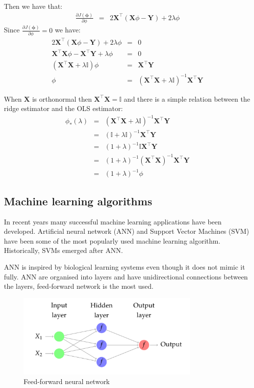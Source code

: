 Then we have that:
\begin{eqnarray*}
\frac{\partial J(\mathbf{\phi})}{\partial \phi}&=& 
 2\mathbf{X}^\top(\mathbf{X}\phi-\mathbf{Y}) + 2\lambda\phi
\end{eqnarray*}
Since $\frac{\partial J(\mathbf{\phi})}{\partial \phi}=0$ we have:
\begin{eqnarray*}
2\mathbf{X}^\top(\mathbf{X}\phi-\mathbf{Y}) + 2\lambda\phi&=&0 \\
\mathbf{X}^\top\mathbf{X}\phi - \mathbf{X}^\top\mathbf{Y} + \lambda\phi &=& 0\\
(\mathbf{X}^\top\mathbf{X}+\lambda\mathbb{I})\phi &=&  \mathbf{X}^\top\mathbf{Y} \\
\phi &=& (\mathbf{X}^\top\mathbf{X}+\lambda\mathbb{I})^{-1}  \mathbf{X}^\top\mathbf{Y}
\end{eqnarray*}


When $\mathbf{X}$ is orthonormal then $\mathbf{X}^\top \mathbf{X} =\mathbb{I}$ and there is a simple relation between the ridge estimator and the OLS estimator:
\begin{eqnarray*}
\phi_* (\lambda) &=& (\mathbf{X}^\top \mathbf{X}+\lambda \mathbb{I})^{-1}\mathbf{X}^\top \mathbf{Y} \\
 &=& (\mathbb{I} + \lambda \mathbb{I})^{-1} \mathbf{X}^\top \mathbf{Y} \\
 &=&(1+\lambda)^{-1} \mathbb{I} \mathbf{X}^\top \mathbf{Y} \\
 &=&(1+\lambda)^{-1} (\mathbf{X}^\top \mathbf{X})^{-1}\mathbf{X}^\top \mathbf{Y} \\
 &=&(1+\lambda)^{-1} \phi
\end{eqnarray*}

\subsection{Machine learning algorithms}
In recent years many successful machine learning applications have been developed. Artificial neural network (ANN) and Support Vector Machines (SVM) have been some of the most popularly used machine learning algorithm. Historically, SVMs emerged after ANN.

ANN is inspired by biological learning systems even though it does not mimic it fully. ANN are organised into layers and have unidirectional connections between the layers, feed-forward network is the most used. 

\begin{figure}[!h]
  \centering
  \includegraphics[width=0.8\textwidth]{img/ffn}
  \caption{Feed-forward neural network}
  \label{fig:ffn}
\end{figure}

